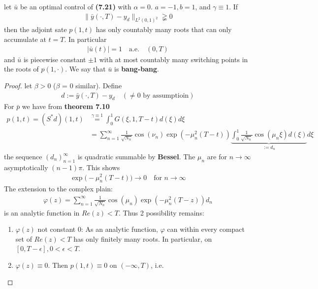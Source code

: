 \begin{theorem}
	let $\bar{u}$ be an optimal control of \textbf{(7.21)} with $\alpha = 0$. $a = -1, b = 1$, and $\gamma \equiv 1$. If 
	\begin{align*}
		\|\bar{y}( \cdot, T) - y_d \|_{L^2(0, 1)^2} \gneqq 0
	\end{align*}
	then the adjoint sate $p(1, t)$ has only countably many roots that can only accumulate at $t = T$. In particular
	\begin{align*}
		|\bar{u}(t)| = 1 \quad \text{a.e.} \quad (0, T)
	\end{align*}
	and $\bar{u}$ is piecewise constant $\pm 1$ with at most countably many switching points in the roots of $p(1, \cdot)$. We say that $\bar{u}$ is \textbf{bang-bang}.
\end{theorem}
\begin{proof}
	let $\beta > 0$ ($\beta$ = 0 similar). Define
	\begin{align*}
		d:= \bar{y} (\cdot, T) - y_d \quad (\neq 0 \text{ by assumptioin})
	\end{align*}
	For $\bar{p}$ we have from \textbf{theorem 7.10}
	\begin{align*}
		p(1, t) = (S^* d)(1, t) &\overset{\gamma \equiv 1}{=} \int_0^1 G(\xi, 1, T - t) d(\xi) d\xi\\
		&= \sum_{n = 1}^\infty \frac{1}{\sqrt{N_n}} \cos(\nu_n) \exp( - \mu_n^2(T - t)) \underbrace{\int_0^1  \frac{1}{\sqrt{N_n}} \cos(\mu_n \xi) d(\xi)}_{:= d_n} d\xi
	\end{align*}
	the sequence $(d_n)^\infty_{n = 1}$ is quadratic summable by \textbf{Bessel}. The $\mu_n$ are for $n \rightarrow \infty$ asymptotically $(n - 1) \pi$. This shows
	\begin{align*}
		\exp\bigg( - \mu_n^2(T - t) \bigg) \rightarrow 0 \quad \text{for } n \rightarrow \infty
	\end{align*}
	The extension to the complex plain:
	\begin{align*}
		\varphi(z) = \sum_{n = 1}^\infty \frac{1}{\sqrt{N_n}} \cos(\mu_n) \exp(-\mu_n^2 (T - z) ) d_n
	\end{align*}
	is an analytic function in $Re(z) < T$. 
	Thus 2 possibility remains:
	\begin{enumerate}
		\item $\varphi(z)$ not constant 0: As an analytic function, $\varphi$ can within every compact set of $Re(z) < T$ has only finitely many roots. In particular, on $[0, T - \epsilon], 0 < \epsilon < T$.
		\item $\varphi(z) \equiv 0$. Then $p(1, t) \equiv 0$ on $(-\infty, T)$, i.e. 

\end{enumerate}
\end{proof}
